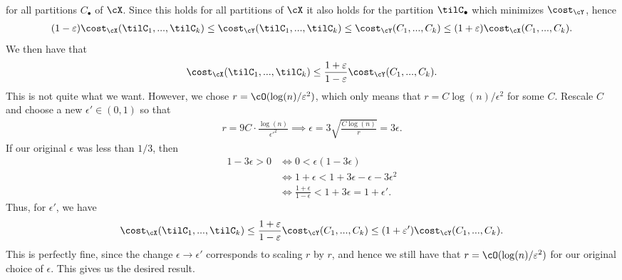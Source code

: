\begin{homework}[e]
\begin{prf}
\begin{enumerate}[(a)]
\begin{align*}
        \end{align*}
        for all partitions $C_\bullet$ of $\cX$. Since this holds for all partitions of $\cX$ it also holds for the partition $\tilC_\bullet$ which minimizes $\cost_\cY$, hence
        \begin{align*}
          (1 - \epsilon)\cost_\cX(\tilC_1,...,\tilC_k) \leq \cost_\cY(\tilC_1,...,\tilC_k) \leq \cost_\cY(C_1,...,C_k) \leq (1+\epsilon)\cost_\cX(C_1,...,C_k).
        \end{align*}
        We then have that
        \begin{align*}
          \cost_\cX(\tilC_1,...,\tilC_k) \leq \frac{1+\epsilon}{1-\epsilon}\cost_\cY(C_1,...,C_k).
        \end{align*}
        This is not quite what we want. However, we chose $r = \cO(\log(n)/\epsilon^2)$, which only means that $r = C\log(n)/\epsilon^2$ for some $C$. Rescale $C$ and choose a new $\epsilon' \in (0,1)$ so that
        \begin{align*}
          r = 9C\cdot \frac{\log(n)}{\epsilon'^2} \implies \epsilon = 3\sqrt{\frac{C\log(n)}{r}} = 3 \epsilon.
        \end{align*}
        If our original $\epsilon$ was less than $1/3$, then
        \begin{align*}
          1 - 3\epsilon > 0 
            &\iff 0 < \epsilon(1 - 3\epsilon) \\
            &\iff  1 + \epsilon < 1 + 3\epsilon - \epsilon - 3\epsilon^2\\
            &\iff \frac{1+\epsilon}{1 - \epsilon} < 1 + 3\epsilon = 1 + \epsilon'.
        \end{align*}
        Thus, for $\epsilon'$, we have
        \begin{align*}
          \cost_\cX(\tilC_1,...,\tilC_k) \leq \frac{1+\epsilon}{1-\epsilon}\cost_\cY(C_1,...,C_k) \leq (1+\epsilon')\cost_\cY(C_1,...,C_k).
        \end{align*}
        This is perfectly fine, since the change $\epsilon \to \epsilon'$ corresponds to scaling $r$ by $r$, and hence we still have that $r = \cO(\log(n)/\epsilon^2)$ for our original choice of $\epsilon$. This gives us the desired result.


\end{enumerate}
\end{prf}
\end{homework}
